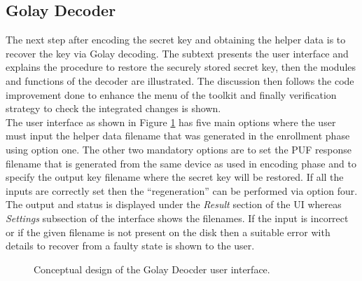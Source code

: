 	\subsection{Golay Decoder}
	The next step after encoding the secret key and obtaining the helper data is to recover the key via Golay decoding. The subtext presents the user interface and explains the procedure to restore the securely stored secret key, then the modules and functions of the decoder are illustrated. The discussion then follows the code improvement done to enhance the menu of the toolkit and finally verification strategy to check the integrated changes is shown.\\

	The user interface as shown in Figure \ref{img:golay_decoder_ui} has five main options where the user must input the helper data filename that was generated in the enrollment phase using option one. The other two mandatory options are to set the PUF response filename that is generated from the same device as used in encoding phase and to specify the output key filename where the secret key will be restored. If all the inputs are correctly set then the ``regeneration'' can be performed via option four. The output and status is displayed
	under the \emph{Result} section of the UI whereas \emph{Settings} subsection of the interface shows the filenames. If the input is incorrect or if the given filename is not present on the disk then a suitable error with details to recover from a faulty state is shown to the user.\\
	\begin{figure}
	\centering
	\caption{Conceptual design of the Golay Deocder user interface.}
	\label{img:golay_decoder_ui}
	\end{figure}

